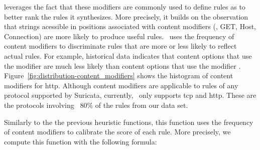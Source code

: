 \documentclass[sigconf,review, anonymous]{acmart}
\begin{document}

\tname{} leverages the fact that these modifiers are commonly used to
define rules as to better rank the rules it synthesizes. More
precisely, it builds on the observation that strings acessible in
positions associated with content modifiers (\eg{}, GET, Host,
Connection) are more likely to produce useful rules. \tname\ uses the
frequency of content modifiers to discriminate rules that are more or
less likely to reflect actual rules. For example, historical data
indicates that content options that use the 
modifier are much less likely than content options that use the
modifier
. Figure~\ref{fig:distribution-content_modifiers}
shows the histogram of content modifiers for http. Although content
modifiers are applicable to rules of any protocol supported by
Suricata, currently, \tname\ only supports tcp and http. These are the
protocols involving ~80\% of the rules from our data set.


Similarly to the the previous heuristic functions, this function uses
the frequency of content modifiers to calibrate the score of each
rule. More precisely, we compute this function with the following
formula:
\end{document}
